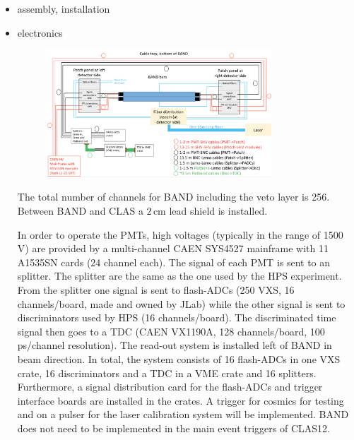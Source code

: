 \documentclass[review]{elsarticle}
\begin{document}
\begin{itemize}
\item assembly, installation
\item electronics
\begin{figure}[h!]
\centering
\includegraphics[width=0.8\textwidth]{figures/layout.png}
\caption{}
\end{figure}

The total number of channels for BAND including the veto layer is 256. Between BAND and CLAS a $2\,\mathrm{cm}$ lead shield is installed.


In order to operate the PMTs, high voltages (typically in the range of 1500 V) are provided by a multi-channel CAEN SYS4527 mainframe with 11 A1535SN cards (24 channel each).
The signal of each PMT is sent to an splitter. The splitter are the same as the one used by the HPS experiment.
From the splitter one signal is sent to flash-ADCs (250 VXS, 16 channels/board, made and owned by JLab) while the other signal is sent to  discriminators used by HPS (16 channels/board).
The discriminated time signal then goes to a TDC (CAEN VX1190A, 128 channels/board, 100 ps/channel resolution). The read-out system is installed left of BAND in beam direction. 
In total, the system consists of 16 flash-ADCs in one VXS crate, 16 discriminators and a TDC in a VME crate and 16 splitters.  Furthermore, a signal distribution card for the flash-ADCs and trigger interface boards are installed in the crates. A trigger for cosmics for testing and on a pulser for the laser calibration system will be implemented. BAND does not need to be implemented in the main event triggers of CLAS12.



\end{itemize}
\end{document}
